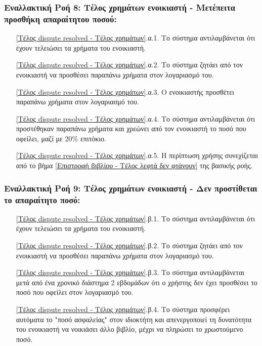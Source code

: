 \documentclass[12pt,a4paper]{article}
\begin{document}
\subsubsection*{Εναλλακτική Ροή 8: Τέλος χρημάτων ενοικιαστή - Μετέπειτα προσθήκη απαραίτητου ποσού:}
\begin{enumerate}
    \item[\ref{Τέλος dispute resolved - Τέλος χρημάτων}.α.1.] Το σύστημα αντιλαμβάνεται ότι έχουν τελειώσει τα χρήματα του ενοικιαστή.
    \item[\ref{Τέλος dispute resolved - Τέλος χρημάτων}.α.2.] Το σύστημα ζητάει από τον ενοικιαστή να προσθέσει παραπάνω χρήματα στον λογαριασμό του.
    \item[\ref{Τέλος dispute resolved - Τέλος χρημάτων}.α.3.] Ο ενοικιαστής προσθέτει παραπάνω χρήματα στον λογαριασμό του.
    \item[\ref{Τέλος dispute resolved - Τέλος χρημάτων}.α.4.] Το σύστημα αντιλαμβάνεται ότι προστέθηκαν παραπάνω χρήματα και χρεώνει από τον ενοικιαστή το ποσό που οφείλει, μαζί με 20\% επιτόκιο.
    \item[\ref{Τέλος dispute resolved - Τέλος χρημάτων}.α.5.] Η περίπτωση χρήσης συνεχίζεται από το βήμα \ref{Επιστροφή βιβλίου - Τέλος λεφτά δεν φτάνουν} της βασικής ροής.
\end{enumerate}

\subsubsection*{Εναλλακτική Ροή 9: Τέλος χρημάτων ενοικιαστή - Δεν προστίθεται το απαραίτητο ποσό:}
\begin{enumerate}
    \item[\ref{Τέλος dispute resolved - Τέλος χρημάτων}.β.1.] Το σύστημα αντιλαμβάνεται ότι έχουν τελειώσει τα χρήματα του ενοικιαστή.
    \item[\ref{Τέλος dispute resolved - Τέλος χρημάτων}.β.2.] Το σύστημα ζητάει από τον ενοικιαστή να προσθέσει παραπάνω χρήματα στον λογαριασμό του.
    \item[\ref{Τέλος dispute resolved - Τέλος χρημάτων}.β.3.] Το σύστημα αντιλαμβάνεται μετά από ένα χρονικό διάστημα 2 εβδομάδων ότι ο χρήστης δεν έχει προσθέσει το ποσό που οφείλει στον λογαριασμό του.
    \item[\ref{Τέλος dispute resolved - Τέλος χρημάτων}.β.4.] Το σύστημα προσφέρει αυτόματα το "ποσό ασφαλείας" στον ιδιοκτήτη και απενεργοποιεί τη δυνατότητα του ενοικιαστή να νοικιάσει άλλο βιβλίο, μέχρι να πληρώσει το χρωστούμενο ποσό.
\end{enumerate}
\end{document}
